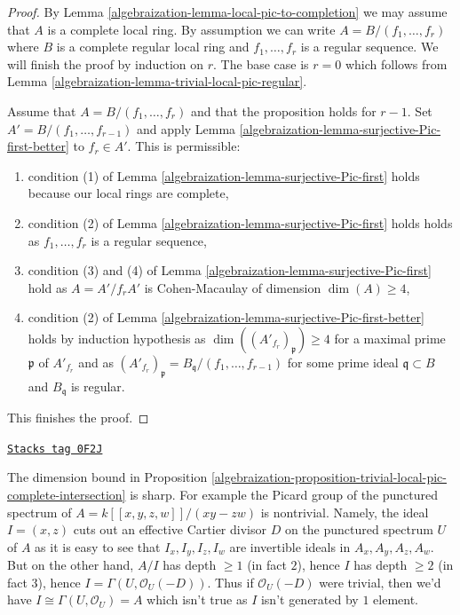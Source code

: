 \begin{proof}

By Lemma \ref{algebraization-lemma-local-pic-to-completion} we may assume that $A$ is
a complete local ring. By assumption we can write
$A = B/(f_1, \ldots, f_r)$ where $B$ is a complete regular local
ring and $f_1, \ldots, f_r$ is a regular sequence.
We will finish the proof by induction on $r$.
The base case is $r = 0$ which follows from
Lemma \ref{algebraization-lemma-trivial-local-pic-regular}.

\medskip\noindent
Assume that $A = B/(f_1, \ldots, f_r)$ and that the proposition
holds for $r - 1$. Set $A' = B/(f_1, \ldots, f_{r - 1})$ and apply
Lemma \ref{algebraization-lemma-surjective-Pic-first-better} to $f_r \in A'$.
This is permissible:
\begin{enumerate}
\item condition (1) of Lemma \ref{algebraization-lemma-surjective-Pic-first} holds
because our local rings are complete,
\item condition (2) of Lemma \ref{algebraization-lemma-surjective-Pic-first} holds
holds as $f_1, \ldots, f_r$ is a regular sequence,
\item condition (3) and (4) of Lemma \ref{algebraization-lemma-surjective-Pic-first} hold
as $A = A'/f_r A'$ is Cohen-Macaulay of dimension $\dim(A) \geq 4$,
\item condition (2) of Lemma \ref{algebraization-lemma-surjective-Pic-first-better}
holds by induction hypothesis as
$\dim((A'_{f_r})_\mathfrak p) \geq 4$ for a maximal
prime $\mathfrak p$ of $A'_{f_r}$ and as
$(A'_{f_r})_\mathfrak p = B_\mathfrak q/(f_1, \ldots, f_{r - 1})$
for some prime ideal $\mathfrak q \subset B$ and $B_\mathfrak q$ is regular.
\end{enumerate}
This finishes the proof.
\end{proof}

\begin{example}
\label{algebraization-example-grothendieck-sharp}
\href{https://stacks.math.columbia.edu/tag/0F2J}{\texttt{Stacks tag 0F2J}}

The dimension bound in
Proposition \ref{algebraization-proposition-trivial-local-pic-complete-intersection}
is sharp. For example the Picard group of the punctured spectrum of
$A = k[[x, y, z, w]]/(xy - zw)$ is nontrivial. Namely, the
ideal $I = (x, z)$ cuts out an effective Cartier divisor $D$ on the punctured
spectrum $U$ of $A$ as it is easy to see that $I_x, I_y, I_z, I_w$
are invertible ideals in $A_x, A_y, A_z, A_w$. But on the other hand,
$A/I$ has depth $\geq 1$ (in fact $2$), hence $I$ has depth $\geq 2$
(in fact $3$), hence
$I = \Gamma(U, \mathcal{O}_U(-D))$. Thus if $\mathcal{O}_U(-D)$
were trivial, then we'd have $I \cong \Gamma(U, \mathcal{O}_U) = A$
which isn't true as $I$ isn't generated by $1$ element.
\end{example}

